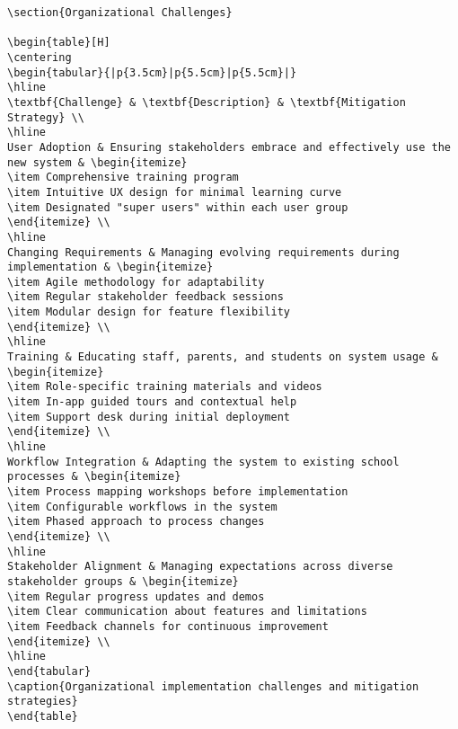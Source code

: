 \documentclass[11pt]{report}
\begin{document}
\begin{verbatim}
\section{Organizational Challenges}

\begin{table}[H]
\centering
\begin{tabular}{|p{3.5cm}|p{5.5cm}|p{5.5cm}|}
\hline
\textbf{Challenge} & \textbf{Description} & \textbf{Mitigation Strategy} \\
\hline
User Adoption & Ensuring stakeholders embrace and effectively use the new system & \begin{itemize}
\item Comprehensive training program
\item Intuitive UX design for minimal learning curve
\item Designated "super users" within each user group
\end{itemize} \\
\hline
Changing Requirements & Managing evolving requirements during implementation & \begin{itemize}
\item Agile methodology for adaptability
\item Regular stakeholder feedback sessions
\item Modular design for feature flexibility
\end{itemize} \\
\hline
Training & Educating staff, parents, and students on system usage & \begin{itemize}
\item Role-specific training materials and videos
\item In-app guided tours and contextual help
\item Support desk during initial deployment
\end{itemize} \\
\hline
Workflow Integration & Adapting the system to existing school processes & \begin{itemize}
\item Process mapping workshops before implementation
\item Configurable workflows in the system
\item Phased approach to process changes
\end{itemize} \\
\hline
Stakeholder Alignment & Managing expectations across diverse stakeholder groups & \begin{itemize}
\item Regular progress updates and demos
\item Clear communication about features and limitations
\item Feedback channels for continuous improvement
\end{itemize} \\
\hline
\end{tabular}
\caption{Organizational implementation challenges and mitigation strategies}
\end{table}


\end{verbatim}
\end{document}
